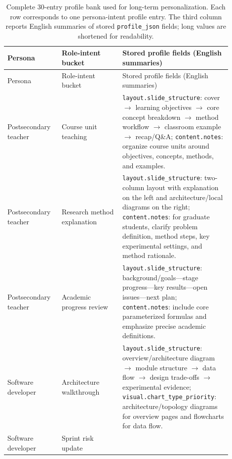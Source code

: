 \begingroup
\small
\setlength{\tabcolsep}{2.4pt}
\renewcommand{\arraystretch}{1.05}
\setlength{\LTleft}{0pt}
\setlength{\LTright}{0pt}
\setlength{\LTcapwidth}{\textwidth}
\begin{longtable}{>{\scriptsize\raggedright\arraybackslash}p{0.22\linewidth}
                  >{\scriptsize\raggedright\arraybackslash}p{0.25\linewidth}
                  >{\scriptsize\raggedright\arraybackslash}p{0.43\linewidth}}
\caption{Complete 30-entry profile bank used for long-term
personalization. Each row corresponds to one persona-intent profile entry. The
third column reports English summaries of stored \texttt{profile\_json} fields;
long values are shortened for readability.}
\label{tab:appendix_profile_library_catalog}\\
\toprule
Persona & Role-intent bucket & Stored profile fields (English summaries) \\
\midrule
\endfirsthead
\toprule
Persona & Role-intent bucket & Stored profile fields (English summaries) \\
\midrule
\endhead
\bottomrule
\endfoot
Postsecondary teacher & Course unit teaching &
\texttt{layout.slide\_structure}: cover $\rightarrow$ learning objectives
$\rightarrow$ core concept breakdown $\rightarrow$ method workflow
$\rightarrow$ classroom example $\rightarrow$ recap/Q\&A;
\texttt{content.notes}: organize course units around objectives, concepts,
methods, and examples. \\
Postsecondary teacher & Research method explanation &
\texttt{layout.slide\_structure}: two-column layout with explanation on the
left and architecture/local diagrams on the right;
\texttt{content.notes}: for graduate students, clarify problem definition,
method steps, key experimental settings, and method rationale. \\
Postsecondary teacher & Academic progress review &
\texttt{layout.slide\_structure}: background/goals---stage progress---key
results---open issues---next plan;
\texttt{content.notes}: include core parameterized formulas and emphasize
precise academic definitions. \\
\midrule
Software developer & Architecture walkthrough &
\texttt{layout.slide\_structure}: overview/architecture diagram
$\rightarrow$ module structure $\rightarrow$ data flow $\rightarrow$ design
trade-offs $\rightarrow$ experimental evidence;
\texttt{visual.chart\_type\_priority}: architecture/topology diagrams for
overview pages and flowcharts for data flow. \\
Software developer & Sprint risk update &

\end{longtable}
